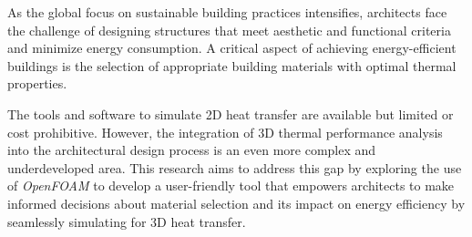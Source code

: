 
\begin{summary}

As the global focus on sustainable building practices intensifies, architects face the challenge of designing structures that meet aesthetic and functional criteria and minimize energy consumption. 
A critical aspect of achieving energy-efficient buildings is the selection of appropriate building materials with optimal thermal properties. 






The tools and software to simulate 2D heat transfer are available but limited or cost prohibitive. However, the integration of 3D thermal performance analysis into the architectural design process is an even more complex and underdeveloped area. 
This research aims to address this gap by exploring the use of \textit{OpenFOAM} to develop a user-friendly tool that empowers architects to make informed decisions about material selection and its impact on energy efficiency by seamlessly simulating for 3D heat transfer.

\end{summary}